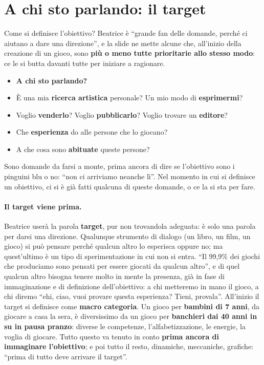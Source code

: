 \section{A chi sto parlando: il target}
\label{a6:sec:target}



Come si definisce l'obiettivo? Beatrice è ``grande fan delle domande, perché ci
aiutano a dare una direzione'', e la slide ne mette alcune che, all'inizio della
creazione di un gioco, sono \textbf{più o meno tutte prioritarie allo stesso modo}:
ce le si butta davanti tutte per iniziare a ragionare.
\begin{itemize}
  \item \textbf{A chi sto parlando?}
  \item È una mia \textbf{ricerca artistica} personale? Un mio modo di
        \textbf{esprimermi}?
  \item Voglio \textbf{venderlo}? Voglio \textbf{pubblicarlo}? Voglio trovare un
        \textbf{editore}?
  \item Che \textbf{esperienza} do alle persone che lo giocano?
  \item A che cosa sono \textbf{abituate} queste persone?
\end{itemize}
Sono domande da farsi a monte, prima ancora di dire se l'obiettivo sono i pinguini
blu o no: ``non ci arriviamo neanche lì''. Nel momento in cui si definisce un
obiettivo, ci si è già fatti qualcuna di queste domande, o ce la si sta per fare.

\paragraph{Il target viene prima.} Beatrice userà la parola \textbf{target}, pur non
trovandola adeguata: è solo una parola per darsi una direzione. Qualunque strumento di
dialogo (un libro, un film, un gioco) si può pensare perché qualcun altro lo esperisca
oppure no; ma quest'ultimo è un tipo di sperimentazione in cui non si entra. ``Il
99,9\% dei giochi che produciamo sono pensati per essere giocati da qualcun altro'', e
di quel qualcun altro bisogna tenere molto in mente la presenza, già in fase di
immaginazione e di definizione dell'obiettivo: a chi metteremo in mano il gioco, a chi
diremo ``ehi, ciao, vuoi provare questa esperienza? Tieni, provala''. All'inizio il
target si definisce come \textbf{macro categoria}. Un gioco per \textbf{bambini di 7
anni}, da giocare a casa la sera, è diversissimo da un gioco per \textbf{banchieri
dai 40 anni in su in pausa pranzo}: diverse le competenze, l'alfabetizzazione, le
energie, la voglia di giocare. Tutto questo va tenuto in conto \textbf{prima ancora
di immaginare l'obiettivo}; e poi tutto il resto, dinamiche, meccaniche, grafiche:
``prima di tutto deve arrivare il target''.

